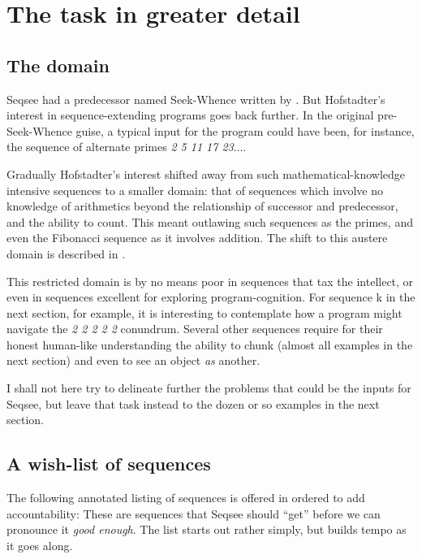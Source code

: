 
% 

\section{The task in greater detail}
\label{sec:task}


\subsection{The domain}
\label{sec:domain}

Seqsee had a predecessor named Seek-Whence written by . But Hofstadter's interest in sequence-extending programs goes back further. In the original pre-Seek-Whence guise, a typical input for the program could have been, for instance, the sequence of alternate primes \emph{2 5 11 17 23$\ldots$}.

Gradually Hofstadter's interest shifted away from such mathematical-knowledge intensive sequences to a smaller domain: that of sequences which involve no knowledge of arithmetics beyond the relationship of successor and predecessor, and the ability to count. This meant outlawing such sequences as the primes, and even the Fibonacci sequence as it involves addition. The shift to this austere domain is described in .

This restricted domain is by no means poor in sequences that tax the intellect, or even in sequences excellent for exploring program-cognition. For sequence k in the next section, for example, it is interesting to contemplate how a program might navigate the \emph{2 2 2 2 2} conundrum. Several other sequences require for their honest human-like understanding the ability to chunk (almost all examples in the next section) and even to see an object \emph{as} another.

I shall not here try to delineate further the problems that could be the inputs for Seqsee, but leave that task instead to the dozen or so examples in the next section.

\subsection{A wish-list of sequences}
\label{sec:list}

The following annotated listing of sequences is offered in ordered to add accountability: These are sequences that Seqsee should ``get'' before we can pronounce it \emph{good enough}. The list starts out rather simply, but builds tempo as it goes along.

